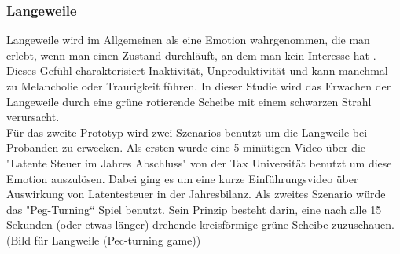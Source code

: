 \subsubsection{Langeweile} \label{langeweile-1}


Langeweile wird im Allgemeinen als eine Emotion wahrgenommen, die man erlebt, wenn man einen Zustand durchläuft, an dem man kein Interesse hat \cite{vodanovich_2003}. 
Dieses Gefühl charakterisiert Inaktivität, Unproduktivität und kann manchmal zu Melancholie oder Traurigkeit führen.
In dieser Studie wird das Erwachen der Langeweile durch eine grüne rotierende Scheibe mit einem schwarzen Strahl verursacht. \\

Für das zweite Prototyp wird zwei Szenarios benutzt um die Langweile bei Probanden zu erwecken.
Als ersten wurde eine 5 minütigen Video über die "Latente Steuer im Jahres Abschluss" von der Tax Universität benutzt um diese Emotion auszulösen. Dabei ging es um eine kurze Einführungsvideo über Auswirkung von Latentesteuer in der Jahresbilanz. 
Als zweites Szenario würde das "Peg-Turning“ Spiel benutzt. Sein Prinzip besteht darin, eine nach alle 15 Sekunden (oder etwas länger) drehende kreisförmige grüne Scheibe zuzuschauen. \\

(Bild für Langweile (Pec-turning game))\\
